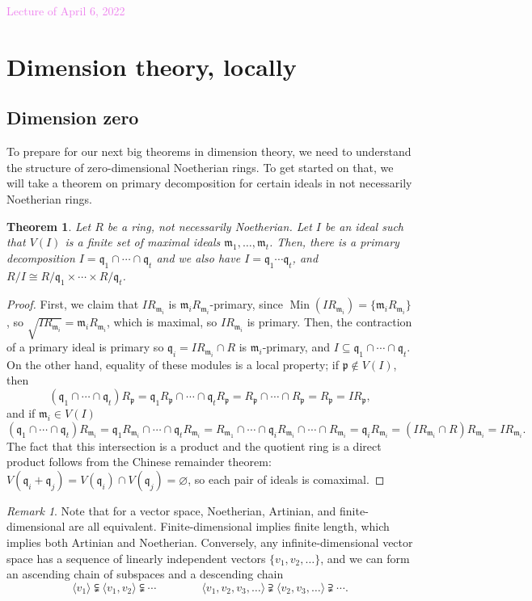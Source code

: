 \documentclass{amsart}[12pt]
\def\Min{\operatorname{Min}}
\newcommand{\Apr}[1]{\textcolor{violet}{Lecture of April #1, 2022}}
\newcommand{\p}{{\mathfrak p}}
\newcommand{\m}{{\mathfrak m}}
\newcommand{\q}{{\mathfrak q}}
\numberwithin{equation}{section}
\theoremstyle{plain} %
\newtheorem{theorem}[equation]{Theorem}
\theoremstyle{definition}
\theoremstyle{remark}
\newtheorem{rem}[equation]{Remark}
\begin{document}
\Apr{6}


\section{Dimension theory, locally}

\subsection{Dimension zero}

To prepare for our next big theorems in dimension theory, we need to understand the structure of zero-dimensional Noetherian rings. To get started on that, we will take a theorem on primary decomposition for certain ideals in not necessarily Noetherian rings.

\begin{theorem} Let $R$ be a ring, not necessarily Noetherian. Let $I$ be an ideal such that $V(I)$ is a finite set of maximal ideals $\m_1,\dots,\m_t$. Then, there is a primary decomposition $I=\q_1 \cap \cdots \cap \q_t$ and we also have $I=\q_1 \cdots \q_t$, and $R/I \cong R/\q_1 \times \cdots \times R/\q_t$.
\end{theorem}
\begin{proof}
	First, we claim that $I R_{\m_i}$ is $\m_i R_{\m_i}$-primary, since $\Min(I R_{\m_i}) = \{ \m_i R_{\m_i} \}$, so $\sqrt{I R_{\m_i}} = \m_i R_{\m_i}$, which is maximal, so $I R_{\m_i}$ is primary.
	Then, the contraction of a primary ideal is primary so $\q_i = I R_{\m_i} \cap R$ is $\m_i$-primary, and $I \subseteq \q_1 \cap \cdots \cap \q_t$. On the other hand, equality of these modules is a local property; if $\p \notin V(I)$, then 
	\[ (\q_1 \cap \cdots \cap \q_t) R_{\p} = \q_1 R_{\p} \cap \cdots \cap  \q_t R_{\p} = R_\p \cap \cdots \cap R_\p = R_\p = I R_\p,\]
	and if $\m_i \in V(I)$
		\[ (\q_1 \cap \cdots \cap \q_t) R_{\m_i} = \q_1 R_{\m_i} \cap \cdots \cap  \q_t R_{\m_i} = R_{\m_1} \cap \cdots \cap \q_i R_{\m_i} \cap \cdots \cap R_{\m_i} = \q_i R_{\m_i} = (I R_{\m_i} \cap R) R_{\m_i} = I R_{\m_i}.\]
	The fact that this intersection is a product and the quotient ring is a direct product follows from the Chinese remainder theorem: $V(\q_i + \q_j) = V(\q_i) \cap V(\q_j) = \varnothing$, so each pair of ideals is comaximal.
\end{proof}


\begin{rem} Note that for a vector space, Noetherian, Artinian, and finite-dimensional are all equivalent. Finite-dimensional implies finite length, which implies both Artinian and Noetherian. Conversely, any infinite-dimensional vector space has a sequence of linearly independent vectors $\{v_1,v_2,\dots\}$, and we can form an ascending chain of subspaces and a descending chain
\[ \langle v_1 \rangle \subsetneqq \langle v_1,v_2  \rangle \subsetneqq \cdots \qquad \qquad \langle v_1, v_2, v_3,\dots \rangle \supsetneqq \langle v_2, v_3,\dots \rangle \supsetneqq \cdots.\]
\end{rem}
\end{document}
